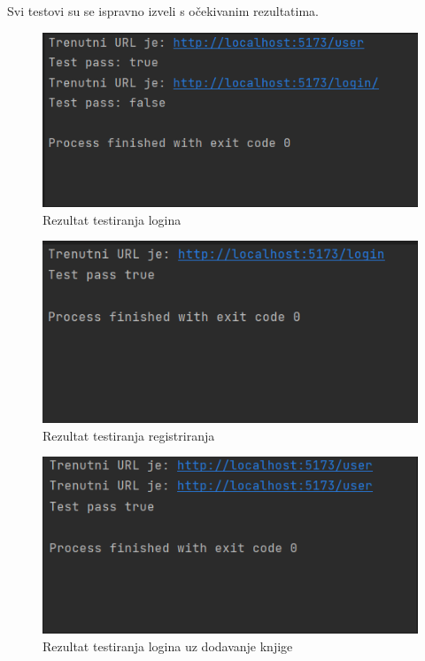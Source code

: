 			

            Svi testovi su se ispravno izveli s očekivanim rezultatima. 
            
			
			
			\begin{figure}[H]
				\includegraphics[width=\textwidth]{slike/SelTest1.PNG} %
				\centering
				\caption{Rezultat testiranja logina }
				\label{fig:loginTest1}
			\end{figure}
			
			
			
			\begin{figure}[H]
				\includegraphics[width=\textwidth]{slike/SelTest2.PNG} %
				\centering
				\caption{Rezultat testiranja registriranja }
				\label{fig:registerTest1}
			\end{figure}
			
			
			
			\begin{figure}[H]
				\includegraphics[width=\textwidth]{slike/SelTest3.PNG} %
				\centering
				\caption{Rezultat testiranja logina uz dodavanje knjige}
				\label{fig:addBookTest1}
			\end{figure}
			
